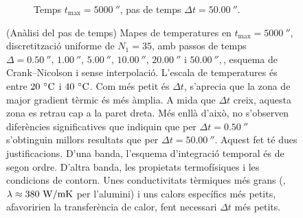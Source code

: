 \begin{figure}[ht]
\begin{subfigure}{.5\textwidth}
		\vspace{-15pt}
		\caption{Temps $t_\text{max} = 5000 \ \second$, pas de temps $\Delta t = 50.00 \ \second$.}
		\label{Temps fig:pas_temps_12}
	\end{subfigure}
	\caption{(Anàlisi del pas de temps) Mapes de temperatures en $t_\text{max} = 5000 \ \second$, discretització uniforme de $N_1 = 35$, amb passos de temps $\Delta = 0.50 \ \second, \, 1.00 \ \second, \, 5.00 \ \second, \, 10.00 \ \second, \, 20.00 \ \second$ i $50.00 \ \second,$, esquema de Crank--Nicolson i sense interpolació. L'escala de temperatures és entre $20 \ \celsius$ i $40 \ \celsius$. Com més petit és $\Delta t$, s'aprecia que la zona de major gradient tèrmic és més àmplia. A mida que $\Delta t$ creix, aquesta zona es retrau cap a la paret dreta. Més enllà d'això, no s'observen diferències significatives que indiquin que per $\Delta t = 0.50 \ \second$ s'obtinguin millors resultats que per $\Delta t = 50.00 \ \second$. Aquest fet té dues justificacions. D'una banda, l'esquema d'integració temporal és de segon ordre. D'altra banda, les propietats termofísiques i les condicions de contorn. Unes conductivitats tèrmiques més grans (\eg, $\lambda \approx 380 \ \watt / \meter \kelvin$ per l'alumini) i uns calors específics més petits, afavoririen la transferència de calor, fent necessari $\Delta t$ més petits.}	
	\label{fig:pas_temps_5000}
\end{figure} 

